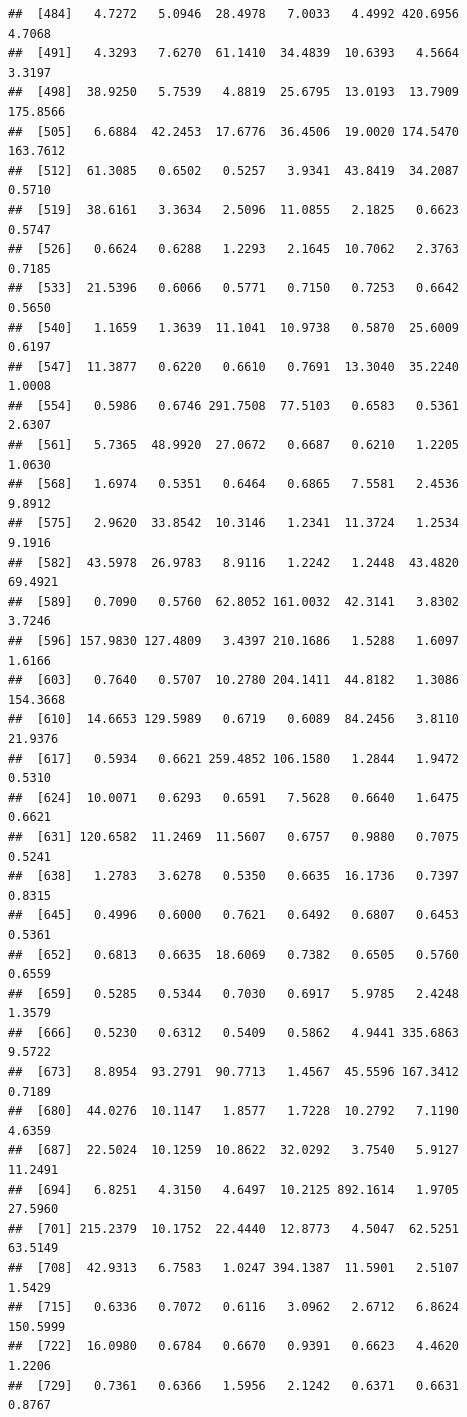 \documentclass{article}\usepackage[]{graphicx}\usepackage[]{color}
\makeatletter
\newenvironment{kframe}{%
 \def\at@end@of@kframe{}%
 \ifinner\ifhmode%
  \def\at@end@of@kframe{\end{minipage}}%
  \begin{minipage}{\columnwidth}%
 \fi\fi%
 \def\FrameCommand##1{\hskip\@totalleftmargin \hskip-\fboxsep
 \colorbox{shadecolor}{##1}\hskip-\fboxsep
     \hskip-\linewidth \hskip-\@totalleftmargin \hskip\columnwidth}%
 \MakeFramed {\advance\hsize-\width
   \@totalleftmargin\z@ \linewidth\hsize
   \@setminipage}}%
 {\par\unskip\endMakeFramed%
 \at@end@of@kframe}
\newenvironment{knitrout}{}{} %
\makeatother
\begin{document}
\begin{knitrout}
\begin{kframe}
\begin{verbatim}
##  [484]   4.7272   5.0946  28.4978   7.0033   4.4992 420.6956   4.7068
##  [491]   4.3293   7.6270  61.1410  34.4839  10.6393   4.5664   3.3197
##  [498]  38.9250   5.7539   4.8819  25.6795  13.0193  13.7909 175.8566
##  [505]   6.6884  42.2453  17.6776  36.4506  19.0020 174.5470 163.7612
##  [512]  61.3085   0.6502   0.5257   3.9341  43.8419  34.2087   0.5710
##  [519]  38.6161   3.3634   2.5096  11.0855   2.1825   0.6623   0.5747
##  [526]   0.6624   0.6288   1.2293   2.1645  10.7062   2.3763   0.7185
##  [533]  21.5396   0.6066   0.5771   0.7150   0.7253   0.6642   0.5650
##  [540]   1.1659   1.3639  11.1041  10.9738   0.5870  25.6009   0.6197
##  [547]  11.3877   0.6220   0.6610   0.7691  13.3040  35.2240   1.0008
##  [554]   0.5986   0.6746 291.7508  77.5103   0.6583   0.5361   2.6307
##  [561]   5.7365  48.9920  27.0672   0.6687   0.6210   1.2205   1.0630
##  [568]   1.6974   0.5351   0.6464   0.6865   7.5581   2.4536   9.8912
##  [575]   2.9620  33.8542  10.3146   1.2341  11.3724   1.2534   9.1916
##  [582]  43.5978  26.9783   8.9116   1.2242   1.2448  43.4820  69.4921
##  [589]   0.7090   0.5760  62.8052 161.0032  42.3141   3.8302   3.7246
##  [596] 157.9830 127.4809   3.4397 210.1686   1.5288   1.6097   1.6166
##  [603]   0.7640   0.5707  10.2780 204.1411  44.8182   1.3086 154.3668
##  [610]  14.6653 129.5989   0.6719   0.6089  84.2456   3.8110  21.9376
##  [617]   0.5934   0.6621 259.4852 106.1580   1.2844   1.9472   0.5310
##  [624]  10.0071   0.6293   0.6591   7.5628   0.6640   1.6475   0.6621
##  [631] 120.6582  11.2469  11.5607   0.6757   0.9880   0.7075   0.5241
##  [638]   1.2783   3.6278   0.5350   0.6635  16.1736   0.7397   0.8315
##  [645]   0.4996   0.6000   0.7621   0.6492   0.6807   0.6453   0.5361
##  [652]   0.6813   0.6635  18.6069   0.7382   0.6505   0.5760   0.6559
##  [659]   0.5285   0.5344   0.7030   0.6917   5.9785   2.4248   1.3579
##  [666]   0.5230   0.6312   0.5409   0.5862   4.9441 335.6863   9.5722
##  [673]   8.8954  93.2791  90.7713   1.4567  45.5596 167.3412   0.7189
##  [680]  44.0276  10.1147   1.8577   1.7228  10.2792   7.1190   4.6359
##  [687]  22.5024  10.1259  10.8622  32.0292   3.7540   5.9127  11.2491
##  [694]   6.8251   4.3150   4.6497  10.2125 892.1614   1.9705  27.5960
##  [701] 215.2379  10.1752  22.4440  12.8773   4.5047  62.5251  63.5149
##  [708]  42.9313   6.7583   1.0247 394.1387  11.5901   2.5107   1.5429
##  [715]   0.6336   0.7072   0.6116   3.0962   2.6712   6.8624 150.5999
##  [722]  16.0980   0.6784   0.6670   0.9391   0.6623   4.4620   1.2206
##  [729]   0.7361   0.6366   1.5956   2.1242   0.6371   0.6631   0.8767

\end{verbatim}
\end{kframe}
\end{knitrout}
\end{document}
